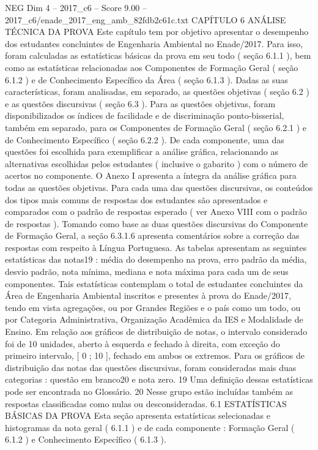 \begin{textsample}{NEG Dim 4 – 2017\_c6 – Score 9.00 – 2017\_c6/enade\_2017\_eng\_amb\_82fdb2c61c.txt}  \label{ex:f4_neg_319}
CAPÍTULO 6 ANÁLISE TÉCNICA DA PROVA Este capítulo tem por objetivo apresentar o desempenho dos estudantes concluintes de Engenharia Ambiental no Enade/2017.
Para isso, foram calculadas as estatísticas básicas da prova em seu todo ( seção 6.1.1 ), bem como as estatísticas relacionadas aos Componentes de Formação Geral ( seção 6.1.2 ) e de Conhecimento Específico da Área ( seção 6.1.3 ).
Dadas as suas características, foram analisadas, em separado, as questões objetivas ( seção 6.2 ) e as questões discursivas ( seção 6.3 ).
Para as questões objetivas, foram disponibilizados os índices de facilidade e de discriminação ponto-bisserial, também em separado, para os Componentes de Formação Geral ( seção 6.2.1 ) e de Conhecimento Específico ( seção 6.2.2 ).
De cada componente, uma das questões foi escolhida para exemplificar a análise gráfica, relacionando as alternativas escolhidas pelos estudantes ( inclusive o gabarito ) com o número de acertos no componente.
O Anexo I apresenta a íntegra da análise gráfica para todas as questões objetivas.
Para cada uma das questões discursivas, os conteúdos dos tipos mais comuns de respostas dos estudantes são apresentados e comparados com o padrão de respostas esperado ( ver Anexo VIII com o padrão de respostas ).
Tomando como base as duas questões discursivas do Componente de Formação Geral, a seção 6.3.1.6 apresenta comentários sobre a correção das respostas com respeito à Língua Portuguesa.
As tabelas apresentam as seguintes estatísticas das notas19 : média do desempenho na prova, erro padrão da média, desvio padrão, nota mínima, mediana e nota máxima para cada um de seus componentes.
Tais estatísticas contemplam o total de estudantes concluintes da Área de Engenharia Ambiental inscritos e presentes à prova do Enade/2017, tendo em vista agregações, ou por Grandes Regiões e o país como um todo, ou por Categoria Administrativa, Organização Acadêmica da IES e Modalidade de Ensino.
Em relação aos gráficos de distribuição de notas, o intervalo considerado foi de 10 unidades, aberto à esquerda e fechado à direita, com exceção do primeiro intervalo, [ 0 ; 10 ], fechado em ambos os extremos.
Para os gráficos de distribuição das notas das questões discursivas, foram consideradas mais duas categorias : questão em branco20 e nota zero. 19 Uma definição dessas estatísticas pode ser encontrada no Glossário. 20 Nesse grupo estão incluídas também as respostas classificadas como nulas ou desconsideradas. 6.1 ESTATÍSTICAS BÁSICAS DA PROVA Esta seção apresenta estatísticas selecionadas e histogramas da nota geral ( 6.1.1 ) e de cada componente : Formação Geral ( 6.1.2 ) e Conhecimento Específico ( 6.1.3 ).

\end{textsample}
